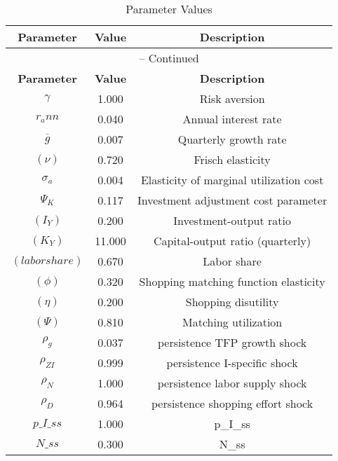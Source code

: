 \begin{center}
\begin{longtable}{ccc}
\caption{Parameter Values}\\%
\toprule%
\multicolumn{1}{c}{\textbf{Parameter}} &
\multicolumn{1}{c}{\textbf{Value}} &
 \multicolumn{1}{c}{\textbf{Description}}\\%
\midrule%
\endfirsthead
\multicolumn{3}{c}{{\tablename} \thetable{} -- Continued}\\%
\midrule%
\multicolumn{1}{c}{\textbf{Parameter}} &
\multicolumn{1}{c}{\textbf{Value}} &
  \multicolumn{1}{c}{\textbf{Description}}\\%
\midrule%
\endhead
${\gamma}$ 	 & 	 1.000 	 & 	 Risk aversion\\
${r_ann}$ 	 & 	 0.040 	 & 	 Annual interest rate\\
${\overline{g}}$ 	 & 	 0.007 	 & 	 Quarterly growth rate\\
$(\nu)$ 	 & 	 0.720 	 & 	 Frisch elasticity\\
${\sigma_a}$ 	 & 	 0.004 	 & 	 Elasticity of marginal utilization cost\\
${\Psi_K}$ 	 & 	 0.117 	 & 	 Investment adjustment cost parameter\\
$(I_Y)$ 	 & 	 0.200 	 & 	 Investment-output ratio\\
$(K_Y)$ 	 & 	 11.000 	 & 	 Capital-output ratio (quarterly)\\
$(labor share)$ 	 & 	 0.670 	 & 	 Labor share\\
$(\phi)$ 	 & 	 0.320 	 & 	 Shopping matching function elasticity\\
$(\eta)$ 	 & 	 0.200 	 & 	 Shopping disutility\\
$(\Psi)$ 	 & 	 0.810 	 & 	 Matching utilization\\
${\rho_g}$ 	 & 	 0.037 	 & 	 persistence TFP growth shock\\
${\rho_{ZI}}$ 	 & 	 0.999 	 & 	 persistence I-specific shock\\
${\rho_N}$ 	 & 	 1.000 	 & 	 persistence labor supply shock\\
${\rho_D}$ 	 & 	 0.964 	 & 	 persistence shopping effort shock\\
$p\_I\_ss$ 	 & 	 1.000 	 & 	 p\_I\_ss\\
$N\_ss$ 	 & 	 0.300 	 & 	 N\_ss\\
\bottomrule%
\end{longtable}
\end{center}
